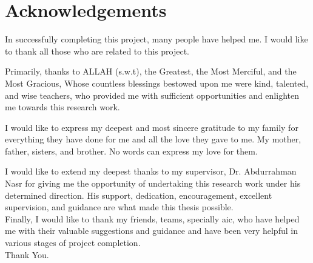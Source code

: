 \chapter*{Acknowledgements}

\noindent
In successfully completing this project, many people have helped me. I would like to thank all those who are related to this project.

\noindent
Primarily, thanks to ALLAH (s.w.t), the Greatest, the Most Merciful, and the Most Gracious,
Whose countless blessings bestowed upon me were kind, talented, and wise teachers, who
provided me with sufficient opportunities and enlighten me towards this research work.

\noindent
I would like to express my deepest and most sincere gratitude to my family for everything they have done for me and all the love they gave to me. My mother, father, sisters, and brother. No words can express my love for them.

\noindent
I would like to extend my deepest thanks to my supervisor, Dr. Abdurrahman Nasr for
giving me the opportunity of undertaking this research work under his determined
direction. His support, dedication, encouragement, excellent supervision, and guidance
are what made this thesis possible. \\[8pt]

\noindent
Finally, I would like to thank my friends, teams, specially \acrfull{aic}, who have helped me with their valuable suggestions and guidance and have been very helpful in various stages of project completion. \\[8pt]

\noindent
Thank You.